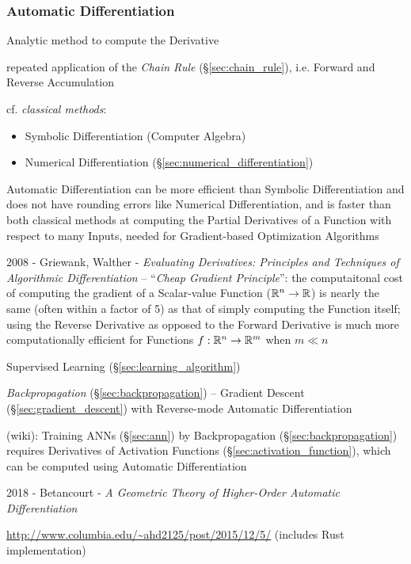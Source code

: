\subsubsection{Automatic Differentiation}\label{sec:automatic_differentiation}

Analytic method to compute the Derivative

repeated application of the \emph{Chain Rule} (\S\ref{sec:chain_rule}), i.e.
Forward and Reverse Accumulation

cf. \emph{classical methods}:

\begin{itemize}
  \item Symbolic Differentiation (Computer Algebra)
  \item Numerical Differentiation (\S\ref{sec:numerical_differentiation})
\end{itemize}

Automatic Differentiation can be more efficient than Symbolic Differentiation
and does not have rounding errors like Numerical Differentiation, and is faster
than both classical methods at computing the Partial Derivatives of a Function
with respect to many Inputs, needed for Gradient-based Optimization Algorithms

2008 - Griewank, Walther - \emph{Evaluating Derivatives: Principles and
Techniques of Algorithmic Differentiation} -- ``\emph{Cheap Gradient
Principle}'': the computaitonal cost of computing the gradient of a Scalar-value
Function ($\mathbb{R}^n \to \mathbb{R}$) is nearly the same (often within a factor of 5)
as that of simply computing the Function itself; using the Reverse Derivative as
opposed to the Forward Derivative is much more computationally efficient for
Functions $f : \mathbb{R}^n \to \mathbb{R}^m$ when $m \ll n$

Supervised Learning (\S\ref{sec:learning_algorithm})

\emph{Backpropagation} (\S\ref{sec:backpropagation}) -- Gradient Descent
(\S\ref{sec:gradient_descent}) with Reverse-mode Automatic Differentiation

(wiki): Training ANNs (\S\ref{sec:ann}) by Backpropagation
(\S\ref{sec:backpropagation}) requires Derivatives of Activation Functions
(\S\ref{sec:activation_function}), which can be computed using Automatic
Differentiation

2018 - Betancourt -
\emph{A Geometric Theory of Higher-Order Automatic Differentiation}

\asterism

\url{http://www.columbia.edu/~ahd2125/post/2015/12/5/} (includes Rust
implementation)

